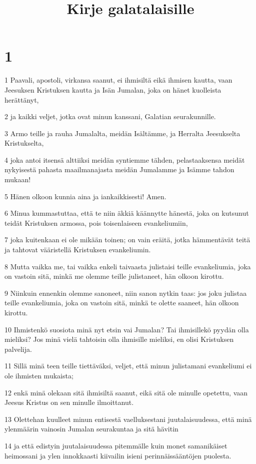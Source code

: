 

\title{Kirje galatalaisille}


\chapter{1}

\par 1 Paavali, apostoli, virkansa saanut, ei ihmisiltä eikä ihmisen kautta, vaan Jeesuksen Kristuksen kautta ja Isän Jumalan, joka on hänet kuolleista herättänyt,
\par 2 ja kaikki veljet, jotka ovat minun kanssani, Galatian seurakunnille.
\par 3 Armo teille ja rauha Jumalalta, meidän Isältämme, ja Herralta Jeesukselta Kristukselta,
\par 4 joka antoi itsensä alttiiksi meidän syntiemme tähden, pelastaaksensa meidät nykyisestä pahasta maailmanajasta meidän Jumalamme ja Isämme tahdon mukaan!
\par 5 Hänen olkoon kunnia aina ja iankaikkisesti! Amen.
\par 6 Minua kummastuttaa, että te niin äkkiä käännytte hänestä, joka on kutsunut teidät Kristuksen armossa, pois toisenlaiseen evankeliumiin,
\par 7 joka kuitenkaan ei ole mikään toinen; on vain eräitä, jotka hämmentävät teitä ja tahtovat vääristellä Kristuksen evankeliumin.
\par 8 Mutta vaikka me, tai vaikka enkeli taivaasta julistaisi teille evankeliumia, joka on vastoin sitä, minkä me olemme teille julistaneet, hän olkoon kirottu.
\par 9 Niinkuin ennenkin olemme sanoneet, niin sanon nytkin taas: jos joku julistaa teille evankeliumia, joka on vastoin sitä, minkä te olette saaneet, hän olkoon kirottu.
\par 10 Ihmistenkö suosiota minä nyt etsin vai Jumalan? Tai ihmisillekö pyydän olla mieliksi? Jos minä vielä tahtoisin olla ihmisille mieliksi, en olisi Kristuksen palvelija.
\par 11 Sillä minä teen teille tiettäväksi, veljet, että minun julistamani evankeliumi ei ole ihmisten mukaista;
\par 12 enkä minä olekaan sitä ihmisiltä saanut, eikä sitä ole minulle opetettu, vaan Jeesus Kristus on sen minulle ilmoittanut.
\par 13 Olettehan kuulleet minun entisestä vaelluksestani juutalaisuudessa, että minä ylenmäärin vainosin Jumalan seurakuntaa ja sitä hävitin
\par 14 ja että edistyin juutalaisuudessa pitemmälle kuin monet samanikäiset heimossani ja ylen innokkaasti kiivailin isieni perinnäissääntöjen puolesta.
